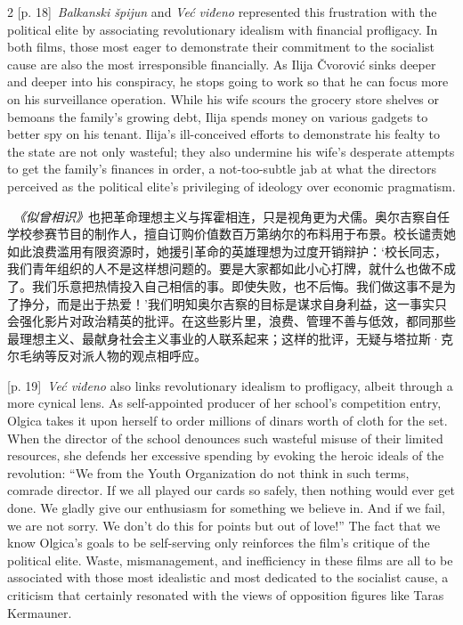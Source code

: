 \documentclass[10pt,a4paper]{article}
\begin{document}
\begin{paracol}{2}
{\scriptsize\color{gray} [p. 18]}\ \textit{Balkanski špijun} and \textit{Već viđeno} represented this frustration with the political elite by associating revolutionary idealism with financial profligacy. In both films, those most eager to demonstrate their commitment to the socialist cause are also the most irresponsible financially. As Ilija Čvorović sinks deeper and deeper into his conspiracy, he stops going to work so that he can focus more on his surveillance operation. While his wife scours the grocery store shelves or bemoans the family’s growing debt, Ilija spends money on various gadgets to better spy on his tenant. Ilija’s ill-conceived efforts to demonstrate his fealty to the state are not only wasteful; they also undermine his wife’s desperate attempts to get the family’s finances in order, a not-too-subtle jab at what the directors perceived as the political elite’s privileging of ideology over economic pragmatism.\par
\switchcolumn*
{\scriptsize\color{gray} [p. 19]}\ \textit{《似曾相识》}也把革命理想主义与挥霍相连，只是视角更为犬儒。奥尔吉察自任学校参赛节目的制作人，擅自订购价值数百万第纳尔的布料用于布景。校长谴责她如此浪费滥用有限资源时，她援引革命的英雄理想为过度开销辩护：‘校长同志，我们青年组织的人不是这样想问题的。要是大家都如此小心打牌，就什么也做不成了。我们乐意把热情投入自己相信的事。即使失败，也不后悔。我们做这事不是为了挣分，而是出于热爱！’我们明知奥尔吉察的目标是谋求自身利益，这一事实只会强化影片对政治精英的批评。在这些影片里，浪费、管理不善与低效，都同那些最理想主义、最献身社会主义事业的人联系起来；这样的批评，无疑与塔拉斯·克尔毛纳等反对派人物的观点相呼应。\par
\switchcolumn
{\scriptsize\color{gray} [p. 19]}\ \textit{Već viđeno} also links revolutionary idealism to profligacy, albeit through a more cynical lens. As self-appointed producer of her school’s competition entry, Olgica takes it upon herself to order millions of dinars worth of cloth for the set. When the director of the school denounces such wasteful misuse of their limited resources, she defends her excessive spending by evoking the heroic ideals of the revolution: “We from the Youth Organization do not think in such terms, comrade director. If we all played our cards so safely, then nothing would ever get done. We gladly give our enthusiasm for something we believe in. And if we fail, we are not sorry. We don’t do this for points but out of love!” The fact that we know Olgica’s goals to be self-serving only reinforces the film’s critique of the political elite. Waste, mismanagement, and inefficiency in these films are all to be associated with those most idealistic and most dedicated to the socialist cause, a criticism that certainly resonated with the views of opposition figures like Taras Kermauner.\par

\end{paracol}
\end{document}
